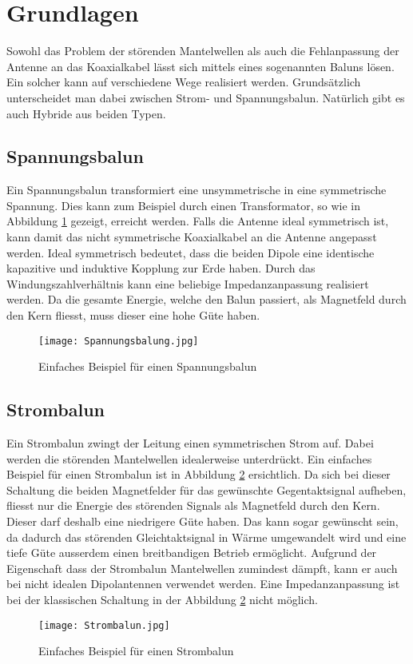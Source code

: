 \section{Grundlagen}

Sowohl das Problem der störenden Mantelwellen als auch die Fehlanpassung der Antenne an das Koaxialkabel lässt sich mittels eines sogenannten Baluns lösen. Ein solcher kann auf verschiedene Wege realisiert werden. Grundsätzlich unterscheidet man dabei zwischen Strom- und Spannungsbalun. Natürlich gibt es auch Hybride aus beiden Typen. 

\subsection{Spannungsbalun}
Ein Spannungsbalun transformiert eine unsymmetrische in eine symmetrische Spannung. Dies kann zum Beispiel durch einen Transformator, so wie in Abbildung \ref{fig:Spannungsbalun} gezeigt, erreicht werden. 
Falls die Antenne ideal symmetrisch ist, kann damit das nicht symmetrische Koaxialkabel an die Antenne angepasst werden. Ideal symmetrisch bedeutet, dass die beiden Dipole eine identische kapazitive und induktive Kopplung zur Erde haben. 
Durch das Windungszahlverhältnis kann eine beliebige Impedanzanpassung realisiert werden. 
Da die gesamte Energie, welche den Balun passiert, als Magnetfeld durch den Kern fliesst, muss dieser eine hohe Güte haben.
\begin{figure}[H]
	\centering
	\texttt{[image: Spannungsbalung.jpg]}
	\caption{Einfaches Beispiel für einen Spannungsbalun}\label{fig:Spannungsbalun}
\end{figure}

\subsection{Strombalun}
\label{sec:strombalun}
Ein Strombalun zwingt der Leitung einen symmetrischen Strom auf. Dabei werden die störenden Mantelwellen idealerweise unterdrückt. Ein einfaches Beispiel für einen Strombalun ist in Abbildung \ref{fig:Strombalun} ersichtlich. Da sich bei dieser Schaltung die beiden Magnetfelder für das gewünschte Gegentaktsignal aufheben, fliesst nur die Energie des störenden Signals als Magnetfeld durch den Kern. Dieser darf deshalb eine niedrigere Güte haben. Das kann sogar gewünscht sein, da dadurch das störenden Gleichtaktsignal in Wärme umgewandelt wird und eine tiefe Güte ausserdem einen breitbandigen Betrieb ermöglicht. Aufgrund der Eigenschaft dass der Strombalun Mantelwellen zumindest dämpft, kann er auch bei nicht idealen Dipolantennen verwendet werden. Eine Impedanzanpassung ist bei der klassischen Schaltung in der Abbildung \ref{fig:Strombalun} nicht möglich.
\begin{figure}[H]
	\centering
	\texttt{[image: Strombalun.jpg]}
	\caption{Einfaches Beispiel für einen Strombalun}\label{fig:Strombalun}
\end{figure}

